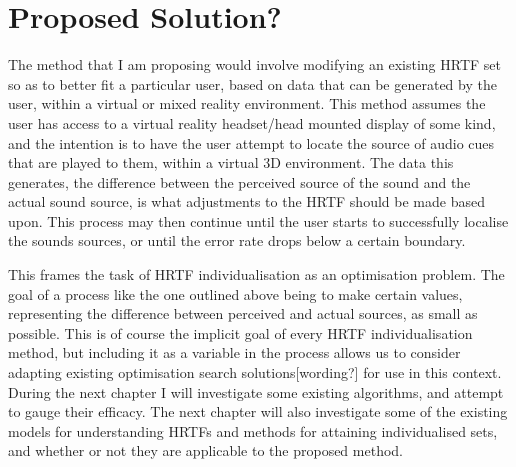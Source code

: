 \section{Proposed Solution?}
The method that I am proposing would involve modifying an existing HRTF set so as to better fit a particular user, based on data that can be generated by the user, within a virtual or mixed reality environment. This method assumes the user has access to a virtual reality headset/head mounted display of some kind, and the intention is to have the user attempt to locate the source of audio cues that are played to them, within a virtual 3D environment. The data this generates, the difference between the perceived source of the sound and the actual sound source, is what adjustments to the HRTF should be made based upon. This process may then continue until the user starts to successfully localise the sounds sources, or until the error rate drops below a certain boundary. 

This frames the task of HRTF individualisation as an optimisation problem. The goal of a process like the one outlined above being to make certain values, representing the difference between perceived and actual sources, as small as possible. This is of course the implicit goal of every HRTF individualisation method, but including it as a variable in the process allows us to consider adapting existing optimisation search solutions[wording?] for use in this context. During the next chapter I will investigate some existing algorithms, and attempt to gauge their efficacy. The next chapter will also investigate some of the existing models for understanding HRTFs and methods for attaining individualised sets, and whether or not they are applicable to the proposed method. 




